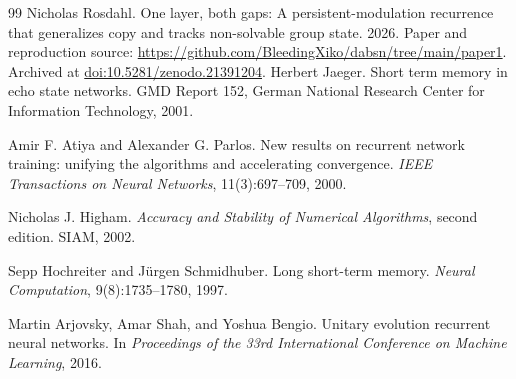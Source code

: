\documentclass[11pt]{article}
\theoremstyle{definition}
\begin{document}
\begin{thebibliography}{99}
Nicholas Rosdahl. One layer, both gaps: A persistent-modulation recurrence that
generalizes copy and tracks non-solvable group state. 2026.
Paper and reproduction source: \url{https://github.com/BleedingXiko/dabsn/tree/main/paper1}.
Archived at \href{https://doi.org/10.5281/zenodo.21391204}{doi:10.5281/zenodo.21391204}.
Herbert Jaeger.
Short term memory in echo state networks.
GMD Report 152, German National Research Center for Information Technology, 2001.

Amir F. Atiya and Alexander G. Parlos.
New results on recurrent network training: unifying the algorithms and accelerating convergence.
\emph{IEEE Transactions on Neural Networks}, 11(3):697--709, 2000.

Nicholas J. Higham.
\emph{Accuracy and Stability of Numerical Algorithms}, second edition.
SIAM, 2002.

Sepp Hochreiter and J{\"u}rgen Schmidhuber.
Long short-term memory.
\emph{Neural Computation}, 9(8):1735--1780, 1997.

Martin Arjovsky, Amar Shah, and Yoshua Bengio.
Unitary evolution recurrent neural networks.
In \emph{Proceedings of the 33rd International Conference on Machine Learning}, 2016.

\end{thebibliography}
\end{document}
